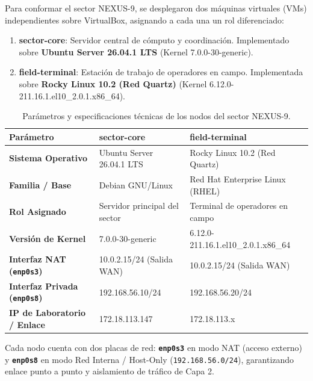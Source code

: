 \documentclass[11pt,a4paper]{article}
\begin{document}
Para conformar el sector NEXUS-9, se desplegaron dos máquinas virtuales (VMs) independientes sobre VirtualBox, asignando a cada una un rol diferenciado:
\begin{enumerate}[leftmargin=*]
    \item \textbf{sector-core}: Servidor central de cómputo y coordinación. Implementado sobre \textbf{Ubuntu Server 26.04.1 LTS} (Kernel 7.0.0-30-generic).
    \item \textbf{field-terminal}: Estación de trabajo de operadores en campo. Implementada sobre \textbf{Rocky Linux 10.2 (Red Quartz)} (Kernel 6.12.0-211.16.1.el10\_2.0.1.x86\_64).
\end{enumerate}

\begin{table}[H]
    \centering
    \footnotesize
    \caption{Parámetros y especificaciones técnicas de los nodos del sector NEXUS-9.}
    \label{tab:infraestructura}
    \begin{tabularx}{\textwidth}{lXX}
        \toprule
        \rowcolor{tableheader}
        \textbf{Parámetro} & \textbf{sector-core} & \textbf{field-terminal} \\
        \midrule
        \textbf{Sistema Operativo} & Ubuntu Server 26.04.1 LTS & Rocky Linux 10.2 (Red Quartz) \\
        \textbf{Familia / Base} & Debian GNU/Linux & Red Hat Enterprise Linux (RHEL) \\
        \textbf{Rol Asignado} & Servidor principal del sector & Terminal de operadores en campo \\
        \textbf{Versión de Kernel} & 7.0.0-30-generic & 6.12.0-211.16.1.el10\_2.0.1.x86\_64 \\
        \textbf{Interfaz NAT (\texttt{enp0s3})} & 10.0.2.15/24 (Salida WAN) & 10.0.2.15/24 (Salida WAN) \\
        \textbf{Interfaz Privada (\texttt{enp0s8})} & 192.168.56.10/24 & 192.168.56.20/24 \\
        \textbf{IP de Laboratorio / Enlace} & 172.18.113.147 & 172.18.113.x \\
        \bottomrule
    \end{tabularx}
\end{table}

\begin{notabox}
    Cada nodo cuenta con dos placas de red: \textbf{\texttt{enp0s3}} en modo NAT (acceso externo) y \textbf{\texttt{enp0s8}} en modo Red Interna / Host-Only (\texttt{192.168.56.0/24}), garantizando enlace punto a punto y aislamiento de tráfico de Capa 2.
\end{notabox}
\end{document}
